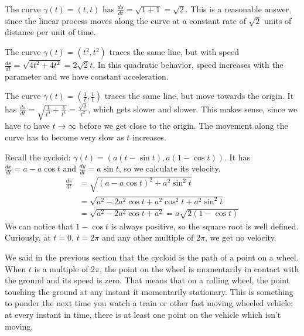 \documentclass[fleqn]{report}
\begin{document}
\begin{example}
The curve $\gamma(t) = (t,t)$ has $\frac{ds}{dt} = \sqrt{1+1}
= \sqrt{2}$. This is a reasonable answer, since the linear
process moves along the curve at a constant rate of $\sqrt{2}$
units of distance per unit of time.
\end{example}

\begin{example}
The curve $\gamma(t) = (t^2,t^2)$ traces the same line,
but with speed $\frac{ds}{dt} = \sqrt{4t^2 + 4t^2} = 2\sqrt{2}
t$. In this quadratic behavior, speed increases with the
parameter and we have constant acceleration.
\end{example}

\begin{example}
The curve $\gamma(t) = \left(\frac{1}{t}, \frac{1}{t}
\right)$ traces the same line, but move towards the origin. It
has $\frac{ds}{dt} = \sqrt{\frac{1}{t^4} + \frac{1}{t^4}} =
\frac{\sqrt{2}}{t^2}$, which gets slower and slower. This
makes sense, since we have to have $t \rightarrow \infty$
before we get close to the origin. The movement along the
curve has to become very slow as $t$ increases.
\end{example}

\begin{example}
Recall the cycloid: $\gamma(t) = (a(t-\sin t),
a(1-\cos t))$. It has $\frac{dx}{dt} = a - a \cos t$ and
$\frac{dy}{dt} = a \sin t$, so we calculate its velocity.
\begin{align*}
\frac{ds}{dt} & = \sqrt{(a-a\cos t)^2 + a^2 \sin^2 t } \\
& = \sqrt{a^2 - 2a^2\cos t + a^2 \cos^2 t + a ^2 \sin^2 t} \\
& = \sqrt{a^2 - 2a^2 \cos t + a^2} = a\sqrt{2(1-\cos t)} 
\end{align*}
We can notice that $1-\cos t$ is always positive, so the square
root is well defined. Curiously, at $t=0$, $t=2\pi$ and
any other multiple of $2\pi$, we get no velocity.
\end{example}

We said in the previous section that the cycloid is the path
of a point on a wheel. When $t$ is a multiple of $2\pi$, the
point on the wheel is momentarily in contact with the ground
and its speed is zero. That means that on a rolling wheel, the
point touching the ground at any instant it momentarily
stationary. This is something to ponder the next time you
watch a train or other fast moving wheeled vehicle: at every
instant in time, there is at least one point on the vehicle
which isn't moving.
\end{document}
